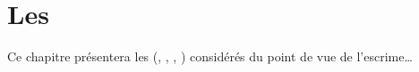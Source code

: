 \chapter{Les \Si{} \Yao}\label{ch:siyao}

Ce chapitre présentera les \Si{} \Yao{} (\Zhan, \Nian, \Lian, \Sui) considérés du point de vue de l'escrime\ldots